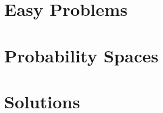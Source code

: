 \documentclass[a4paper]{report}
\begin{document}
\hideanswers

\chapter{Easy Problems}

\renewcommand{\theenumi}{\thechapter.\arabic{enumi}}
\begin{enumerate}
\foreachproblem[easyproblems]{\item\label{prob:\thisproblemlabel}\thisproblem}
\end{enumerate}

\chapter{Probability Spaces}

\renewcommand{\theenumi}{\thechapter.\arabic{enumi}}
\begin{enumerate}
\foreachproblem[probspaces]{\item\label{prob:\thisproblemlabel}\thisproblem}
\end{enumerate}

\appendix
\chapter{Solutions}
\showanswers
\begin{enumerate}
\foreachdataset{\thisdataset}{%
\foreachproblem[\thisdataset]{\item[\ref{prob:\thisproblemlabel}]\thisproblem}
}
\end{enumerate}
\end{document}
